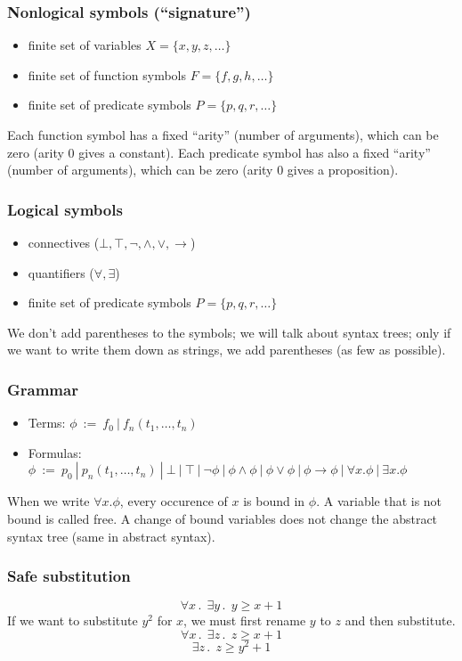 {{\subsubsection{Nonlogical symbols (``signature'')}
\begin{itemize}
\item finite set of variables $X = \{ x, y, z, \dots \}$
\item finite set of function symbols $F = \{ f, g, h, \dots \}$
\item finite set of predicate symbols $P = \{ p, q, r, \dots \}$
\end{itemize}
Each function symbol has a fixed ``arity'' (number of arguments), which can be zero (arity 0 gives a constant).
Each predicate symbol has also a fixed ``arity'' (number of arguments), which can be zero (arity 0 gives a proposition).

\subsubsection{Logical symbols}
\begin{itemize}
\item connectives ($\bot, \top, \neg, \wedge, \vee, \rightarrow$)
\item quantifiers ($\forall, \exists$)
\item finite set of predicate symbols $P = \{ p, q, r, \dots \}$
\end{itemize}
We don't add parentheses to the symbols; we will talk about syntax trees;
only if we want to write them down as strings, we add parentheses (as few as possible).

\subsubsection{Grammar}
\begin{itemize}
\item Terms: $\phi ~:=~ f_0 ~|~ f_n(t_1,\dots,t_n)$
\item Formulas: $\phi ~:=~ p_0 ~|~ p_n(t_1,\dots,t_n) ~|~ \bot ~|~ \top ~|~ \neg\phi ~|~ \phi\wedge\phi ~|~ \phi\vee\phi ~|~ \phi\rightarrow\phi ~|~ \forall x. \phi ~|~ \exists x. \phi$
\end{itemize}
When we write $\forall x. \phi$, every occurence of $x$ is bound in $\phi$.
A variable that is not bound is called free.
A change of bound variables does not change the abstract syntax tree (same in abstract syntax).

\subsubsection{Safe substitution}
$$\forall x\,.\;\, \exists y\,.\;\, y \ge x + 1$$
If we want to substitute $y^2$ for $x$, we must first rename $y$ to $z$ and then substitute.
$$\forall x\,.\;\, \exists z\,.\;\, z \ge x + 1$$
$$\exists z\,.\;\, z \ge y^2 + 1$$

}} %
